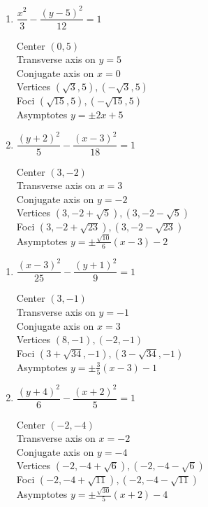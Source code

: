 \documentclass{ximera}
\begin{document}
\begin{multicols}{2}
\begin{enumerate}
\setcounter{enumi}{\value{HW}}


\item $\dfrac{x^{2}}{3} - \dfrac{(y - 5)^{2}}{12} = 1$

Center $(0, 5)$\\
Transverse axis on $y = 5$\\
Conjugate axis on $x = 0$\\
Vertices $(\sqrt{3}, 5), (-\sqrt{3}, 5)$\\
Foci $(\sqrt{15}, 5), (-\sqrt{15}, 5)$\\
Asymptotes $y = \pm 2x + 5$

\item $\dfrac{(y + 2)^{2}}{5} - \dfrac{(x - 3)^{2}}{18} = 1$

Center $(3, -2)$\\
Transverse axis on $x = 3$\\
Conjugate axis on $y = -2$\\
Vertices $(3, -2 + \sqrt{5}), (3, -2 - \sqrt{5})$\\
Foci $(3, -2 + \sqrt{23}), (3, -2 - \sqrt{23})$\\
Asymptotes $y = \pm \frac{\sqrt{10}}{6}(x - 3) - 2$


\setcounter{HW}{\value{enumi}}
\end{enumerate}
\end{multicols}


\begin{multicols}{2}
\begin{enumerate}
\setcounter{enumi}{\value{HW}}

\item $\dfrac{(x-3)^{2}}{25} - \dfrac{(y+1)^{2}}{9} = 1$

Center $(3, -1)$\\
Transverse axis on $y=-1$\\
Conjugate axis on $x=3$\\
Vertices $(8, -1), (-2, -1)$\\
Foci $\left(3+\sqrt{34}, -1 \right), \left(3-\sqrt{34}, -1 \right)$\\
Asymptotes $y = \pm \frac{3}{5}(x - 3) - 1$



\item $\dfrac{(y+4)^{2}}{6} - \dfrac{(x+2)^{2}}{5} = 1$

Center $(-2, -4)$\\
Transverse axis on $x=-2$\\
Conjugate axis on $y=-4$\\
Vertices $\left(-2,-4+\sqrt{6} \right), \left(-2,-4-\sqrt{6} \right)$\\
Foci $\left(-2, -4+\sqrt{11} \right), \left(-2, -4-\sqrt{11} \right)$\\
Asymptotes $y = \pm \frac{\sqrt{30}}{5}(x + 2) - 4$


\setcounter{HW}{\value{enumi}}
\end{enumerate}
\end{multicols}
\end{document}

